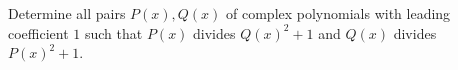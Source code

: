 Determine all pairs \(P(x),Q(x)\) of complex polynomials with leading coefficient \(1\) such that \(P(x)\) divides \(Q(x)^2+1\) and \(Q(x)\) divides \(P(x)^2+1\).

